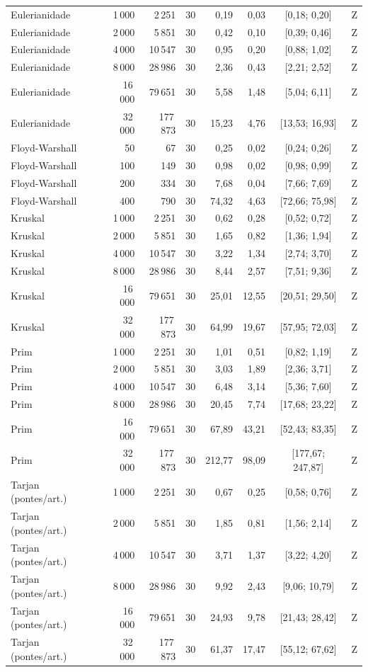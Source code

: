 \begin{tabular}{lrrrrrcc}
    Eulerianidade & 1\,000 & 2\,251 & 30 & 0,19 & 0,03 & [0,18; 0,20] & Z \\
    Eulerianidade & 2\,000 & 5\,851 & 30 & 0,42 & 0,10 & [0,39; 0,46] & Z \\
    Eulerianidade & 4\,000 & 10\,547 & 30 & 0,95 & 0,20 & [0,88; 1,02] & Z \\
    Eulerianidade & 8\,000 & 28\,986 & 30 & 2,36 & 0,43 & [2,21; 2,52] & Z \\
    Eulerianidade & 16\,000 & 79\,651 & 30 & 5,58 & 1,48 & [5,04; 6,11] & Z \\
    Eulerianidade & 32\,000 & 177\,873 & 30 & 15,23 & 4,76 & [13,53; 16,93] & Z \\
    Floyd-Warshall & 50 & 67 & 30 & 0,25 & 0,02 & [0,24; 0,26] & Z \\
    Floyd-Warshall & 100 & 149 & 30 & 0,98 & 0,02 & [0,98; 0,99] & Z \\
    Floyd-Warshall & 200 & 334 & 30 & 7,68 & 0,04 & [7,66; 7,69] & Z \\
    Floyd-Warshall & 400 & 790 & 30 & 74,32 & 4,63 & [72,66; 75,98] & Z \\
    Kruskal & 1\,000 & 2\,251 & 30 & 0,62 & 0,28 & [0,52; 0,72] & Z \\
    Kruskal & 2\,000 & 5\,851 & 30 & 1,65 & 0,82 & [1,36; 1,94] & Z \\
    Kruskal & 4\,000 & 10\,547 & 30 & 3,22 & 1,34 & [2,74; 3,70] & Z \\
    Kruskal & 8\,000 & 28\,986 & 30 & 8,44 & 2,57 & [7,51; 9,36] & Z \\
    Kruskal & 16\,000 & 79\,651 & 30 & 25,01 & 12,55 & [20,51; 29,50] & Z \\
    Kruskal & 32\,000 & 177\,873 & 30 & 64,99 & 19,67 & [57,95; 72,03] & Z \\
    Prim & 1\,000 & 2\,251 & 30 & 1,01 & 0,51 & [0,82; 1,19] & Z \\
    Prim & 2\,000 & 5\,851 & 30 & 3,03 & 1,89 & [2,36; 3,71] & Z \\
    Prim & 4\,000 & 10\,547 & 30 & 6,48 & 3,14 & [5,36; 7,60] & Z \\
    Prim & 8\,000 & 28\,986 & 30 & 20,45 & 7,74 & [17,68; 23,22] & Z \\
    Prim & 16\,000 & 79\,651 & 30 & 67,89 & 43,21 & [52,43; 83,35] & Z \\
    Prim & 32\,000 & 177\,873 & 30 & 212,77 & 98,09 & [177,67; 247,87] & Z \\
    Tarjan (pontes/art.) & 1\,000 & 2\,251 & 30 & 0,67 & 0,25 & [0,58; 0,76] & Z \\
    Tarjan (pontes/art.) & 2\,000 & 5\,851 & 30 & 1,85 & 0,81 & [1,56; 2,14] & Z \\
    Tarjan (pontes/art.) & 4\,000 & 10\,547 & 30 & 3,71 & 1,37 & [3,22; 4,20] & Z \\
    Tarjan (pontes/art.) & 8\,000 & 28\,986 & 30 & 9,92 & 2,43 & [9,06; 10,79] & Z \\
    Tarjan (pontes/art.) & 16\,000 & 79\,651 & 30 & 24,93 & 9,78 & [21,43; 28,42] & Z \\
    Tarjan (pontes/art.) & 32\,000 & 177\,873 & 30 & 61,37 & 17,47 & [55,12; 67,62] & Z \\
    \bottomrule
\end{tabular}
